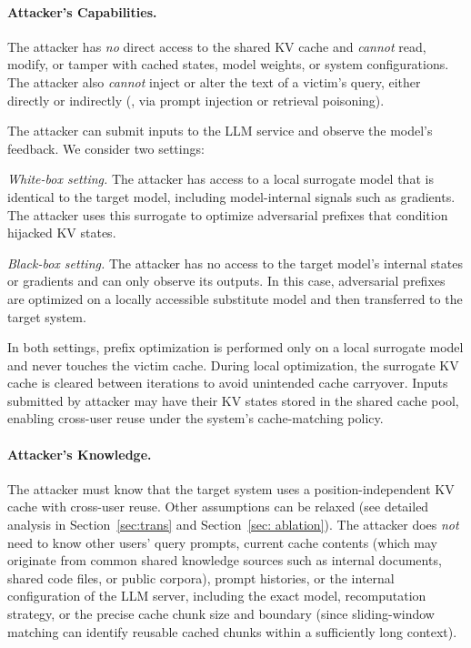 \paragraph{Attacker's Capabilities.}
The attacker has \textit{no} direct access to the shared KV cache and \textit{cannot} read, modify, or tamper with cached states, model weights, or system configurations. The attacker also \textit{cannot} inject or alter the text of a victim's query, either directly or indirectly (\eg, via prompt injection or retrieval poisoning). 

The attacker can submit inputs to the LLM service and observe the model's feedback. We consider two settings:

\begin{icompact}
    \item \emph{White-box setting.} The attacker has access to a local surrogate model that is identical to the target model, including model-internal signals such as gradients. The attacker uses this surrogate to optimize adversarial prefixes that condition hijacked KV states.
    \item \emph{Black-box setting.} The attacker has no access to the target model's internal states or gradients and can only observe its outputs. In this case, adversarial prefixes are optimized on a locally accessible substitute model and then transferred to the target system.
\end{icompact}

In both settings, prefix optimization is performed only on a local surrogate model and never touches the victim cache. During local optimization, the surrogate KV cache is cleared between iterations to avoid unintended cache carryover. Inputs submitted by attacker may have their KV states stored in the shared cache pool, enabling cross-user reuse under the system's cache-matching policy.

\paragraph{Attacker's Knowledge.}
The attacker must know that the target system uses a position-independent KV cache with cross-user reuse. Other assumptions can be relaxed (see detailed analysis in Section~\ref{sec:trans} and Section~\ref{sec: ablation}). The attacker does \textit{not} need to know other users’ query prompts, current cache contents (which may originate from common shared knowledge sources such as internal documents, shared code files, or public corpora), prompt histories, or the internal configuration of the LLM server, including the exact model, recomputation strategy, or the precise cache chunk size and boundary (since sliding-window matching can identify reusable cached chunks within a sufficiently long context).


